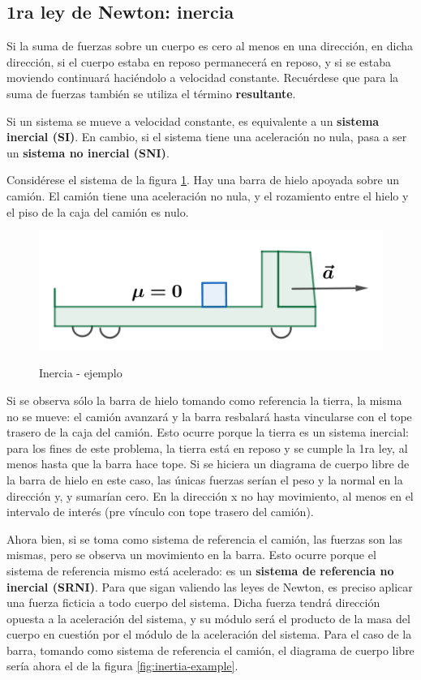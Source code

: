 \documentclass{article}
\begin{document}
\subsection{1ra ley de Newton: inercia}

Si la suma de fuerzas sobre un cuerpo es cero al menos en una dirección, en dicha dirección, si el cuerpo estaba en reposo permanecerá en reposo, y si se estaba moviendo continuará haciéndolo a velocidad constante. Recuérdese que para la suma de fuerzas también se utiliza el término \textbf{resultante}.

Si un sistema se mueve a velocidad constante, es equivalente a un \textbf{sistema inercial (SI)}. En cambio, si el sistema tiene una aceleración no nula, pasa a ser un \textbf{sistema no inercial (SNI)}.

Considérese el sistema de la figura \ref{fig:inertia}. Hay una barra de hielo apoyada sobre un camión. El camión tiene una aceleración no nula, y el rozamiento entre el hielo y el piso de la caja del camión es nulo.

\begin{figure}[ht]
\centering
\caption{Inercia - ejemplo}
\includegraphics[scale=1.0]{../../common/img/62.01/theory/09-dynamics-inertia.png}
\label{fig:inertia}
\end{figure}

Si se observa sólo la barra de hielo tomando como referencia la tierra, la misma no se mueve: el camión avanzará y la barra resbalará hasta vincularse con el tope trasero de la caja del camión. Esto ocurre porque la tierra es un sistema inercial: para los fines de este problema, la tierra está en reposo y se cumple la 1ra ley, al menos hasta que la barra hace tope. Si se hiciera un diagrama de cuerpo libre de la barra de hielo en este caso, las únicas fuerzas serían el peso y la normal en la dirección y, y sumarían cero. En la dirección x no hay movimiento, al menos en el intervalo de interés (pre vínculo con tope trasero del camión).

Ahora bien, si se toma como sistema de referencia el camión, las fuerzas son las mismas, pero se observa un movimiento en la barra. Esto ocurre porque el sistema de referencia mismo está acelerado: es un \textbf{sistema de referencia no inercial (SRNI)}. Para que sigan valiendo las leyes de Newton, es preciso aplicar una fuerza ficticia a todo cuerpo del sistema. Dicha fuerza tendrá dirección opuesta a la aceleración del sistema, y su módulo será el producto de la masa del cuerpo en cuestión por el módulo de la aceleración del sistema. Para el caso de la barra, tomando como sistema de referencia el camión, el diagrama de cuerpo libre sería ahora el de la figura \ref{fig:inertia-example}.
\end{document}
